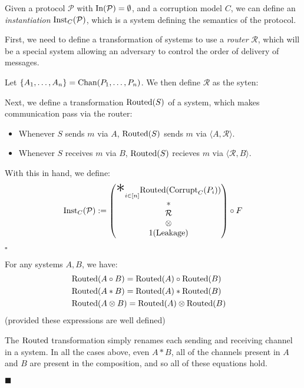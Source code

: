 \begin{definition}[Instantiation]
  Given a protocol $\mathcal{P}$ with $\text{In}(\mathcal{P}) = \emptyset$, and a corruption model $C$, we can
  define an \emph{instantiation} $\text{Inst}_C(\mathcal{P})$, which
  is a system defining the semantics of the protocol.

  First, we need to define a transformation of systems to use
  a \emph{router} $\mathcal{R}$, which will be a special system
  allowing an adversary to control the order of delivery of messages.

  Let $\{A_1, \ldots, A_n\} = \text{Chan}(P_1, \ldots, P_n)$.
  We then define $\mathcal{R}$ as the syten:

  Next, we define a transformation $\text{Routed}(S)$ of a system,
  which makes communication pass via the router:
  \begin{itemize}
    \item Whenever $S$ sends $m$ via $A$, $\text{Routed}(S)$ sends $m$ via $\langle A , \mathcal{R} \rangle$.
    \item Whenever $S$ receives $m$ via $B$, $\text{Routed}(S)$ recieves $m$ via $\langle \mathcal{R}, B \rangle$.
  \end{itemize}

With this in hand, we define:
$$
\tx{Inst}_C(\mathcal{P}) :=
  \begin{pmatrix}
    {\displaystyle \bigast}_{i \in [n]} \tx{Routed}(\tx{Corrupt}_C(P_i))\cr
    *\cr
    \mathcal{R}\cr
    \otimes\cr
    1(\tx{Leakage})
  \end{pmatrix}
  \circ F
$$


$\square$
\end{definition}

\begin{lemma}
  \label{thm:routed}
  For any systems $A, B$, we have:
$$
\begin{aligned}
  &\text{Routed}(A \circ B) = \text{Routed}(A) \circ \text{Routed}(B)\cr
  &\text{Routed}(A * B) = \text{Routed}(A) * \text{Routed}(B)\cr
  &\text{Routed}(A \otimes B) = \text{Routed}(A) \otimes \text{Routed}(B)\cr
\end{aligned}
$$
(provided these expressions are well defined)

 The $\text{Routed}$ transformation simply
renames each sending and receiving channel in a system.
In all the cases above, even $A * B$, all of the channels present
in $A$ and $B$ are present in the composition, and so all
of these equations hold.

$\blacksquare$
\end{lemma}


